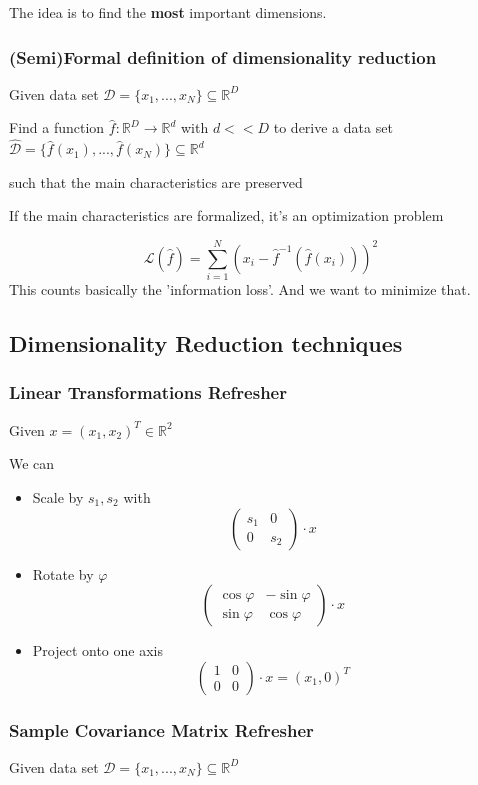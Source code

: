 \documentclass{article}
\begin{document}
The idea is to find the \textbf{most} important dimensions.

\subsubsection{(Semi)Formal definition of dimensionality reduction}
Given data set $\mathcal{D} = \{x_1,...,x_N\}\subseteq \mathbb{R}^D$

Find a function $\hat{f} : \mathbb{R}^D\to \mathbb{R}^d$ with $d<<D$
to derive a data set $\hat{\mathcal{D}} = \{\hat{f}(x_1),...,\hat{f}(x_N)\} \subseteq \mathbb{R}^d$

such that the main characteristics are preserved

If the main characteristics are formalized, it's an optimization problem

\[\mathcal{L}(\hat{f}) = \sum_{i=1}^{N}(x_i - \hat{f}^{-1}(\hat{f}(x_i)))^2\]
This counts basically the 'information loss'. And we want to minimize that.

\subsection{Dimensionality Reduction techniques}
\subsubsection{Linear Transformations Refresher}
Given $x = (x_1,x_2)^T\in\mathbb{R}^2$

We can
\begin{itemize}
  \item Scale by $s_1,s_2$ with 
  \[\begin{pmatrix}
    s_1 & 0 \\
    0 & s_2
  \end{pmatrix}\cdot x\]
  \item Rotate by $\varphi$
  \[\begin{pmatrix}
    \cos\varphi & -\sin\varphi \\
    \sin\varphi & \cos\varphi
  \end{pmatrix}\cdot x\]
  \item Project onto one axis
  \[\begin{pmatrix}
    1 & 0 \\
    0 & 0
  \end{pmatrix}\cdot x = (x_1,0)^T\]
\end{itemize}
\subsubsection{Sample Covariance Matrix Refresher}
Given data set $\mathcal{D} = \{x_1,...,x_N\}\subseteq \mathbb{R}^D$
\end{document}
